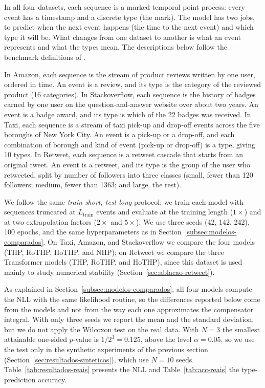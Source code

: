 In all four datasets, each sequence is a marked temporal point process: every event has a timestamp and a discrete type (the mark). The model has two jobs, to predict when the next event happens (the time to the next event) and which type it will be. What changes from one dataset to another is what an event represents and what the types mean. The descriptions below follow the benchmark definitions of \cite{xue_easytpp_2024}.

In Amazon, each sequence is the stream of product reviews written by one user, ordered in time. An event is a review, and its type is the category of the reviewed product (16 categories). In Stackoverflow, each sequence is the history of badges earned by one user on the question-and-answer website over about two years. An event is a badge award, and its type is which of the 22 badges was received. In Taxi, each sequence is a stream of taxi pick-up and drop-off events across the five boroughs of New York City. An event is a pick-up or a drop-off, and each combination of borough and kind of event (pick-up or drop-off) is a type, giving 10 types. In Retweet, each sequence is a retweet cascade that starts from an original tweet. An event is a retweet, and its type is the group of the user who retweeted, split by number of followers into three classes (small, fewer than 120 followers; medium, fewer than 1363; and large, the rest).

We follow the same \textit{train short, test long} protocol: we train each model with sequences truncated at $L_{\text{train}}$ events and evaluate at the training length ($1\times$) and at two extrapolation factors ($2\times$ and $5\times$). We use three seeds (42, 142, 242), 100 epochs, and the same hyperparameters as in Section~\ref{subsec:modelos-comparados}. On Taxi, Amazon, and Stackoverflow we compare the four models (THP, RoTHP, HoTHP, and NHP); on Retweet we compare the three Transformer models (THP, RoTHP, and HoTHP), since this dataset is used mainly to study numerical stability (Section~\ref{sec:ablacao-retweet}).

As explained in Section~\ref{subsec:modelos-comparados}, all four models compute the NLL with the same likelihood routine, so the differences reported below come from the models and not from the way each one approximates the compensator integral. With only three seeds we report the mean and the standard deviation, but we do not apply the Wilcoxon test on the real data. With $N = 3$ the smallest attainable one-sided $p$-value is $1/2^3 = 0.125$, above the level $\alpha = 0.05$, so we use the test only in the synthetic experiments of the previous section (Section~\ref{sec:resultados-sinteticos}), which use $N = 10$ seeds. Table~\ref{tab:resultados-reais} presents the NLL and Table~\ref{tab:acc-reais} the type-prediction accuracy.

